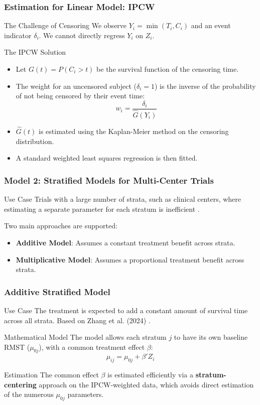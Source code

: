 \documentclass{beamer}
\begin{document}
\begin{frame}
\frametitle{Estimation for Linear Model: IPCW}
\begin{block}{The Challenge of Censoring}
We observe $Y_i = \min(T_i, C_i)$ and an event indicator $\delta_i$. We cannot directly regress $Y_i$ on $Z_i$.
\end{block}

\begin{block}{The IPCW Solution}
\begin{itemize}
    \item Let $G(t) = P(C_i > t)$ be the survival function of the censoring time.
    \item The weight for an uncensored subject ($\delta_i=1$) is the inverse of the probability of not being censored by their event time:
    $$w_i = \frac{\delta_i}{\hat{G}(Y_i)}$$
    \item $\hat{G}(t)$ is estimated using the Kaplan-Meier method on the censoring distribution.
    \item A standard weighted least squares regression is then fitted.
\end{itemize}
\end{block}
\end{frame}

\begin{frame}
\frametitle{Model 2: Stratified Models for Multi-Center Trials}
\begin{block}{Use Case}
Trials with a large number of strata, such as clinical centers, where estimating a separate parameter for each stratum is inefficient \cite{[1]}.
\end{block}
Two main approaches are supported:
\begin{itemize}
    \item \textbf{Additive Model}: Assumes a constant treatment benefit across strata.
    \item \textbf{Multiplicative Model}: Assumes a proportional treatment benefit across strata.
\end{itemize}
\end{frame}

\begin{frame}
\frametitle{Additive Stratified Model}
\begin{block}{Use Case}
The treatment is expected to add a constant amount of survival time across all strata. Based on Zhang et al. (2024) \cite{[1]}.
\end{block}
\begin{block}{Mathematical Model}
The model allows each stratum $j$ to have its own baseline RMST ($\mu_{0j}$), with a common treatment effect $\beta$:
$$\mu_{ij} = \mu_{0j} + \beta'Z_i$$
\end{block}
\begin{block}{Estimation}
The common effect $\beta$ is estimated efficiently via a \textbf{stratum-centering} approach on the IPCW-weighted data, which avoids direct estimation of the numerous $\mu_{0j}$ parameters.
\end{block}
\end{frame}
\end{document}

